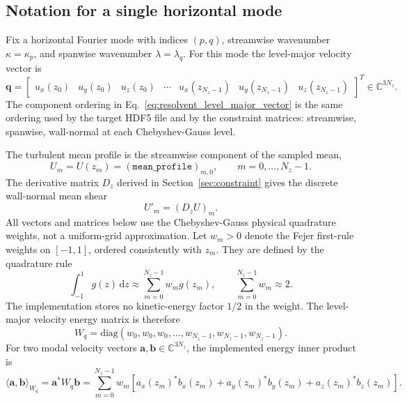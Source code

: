 \documentclass[11pt]{article}
\newcommand{\dd}{\mathrm{d}}
\newcommand{\bfa}{\bm{a}}
\newcommand{\bfb}{\bm{b}}
\newcommand{\bfq}{\bm{q}}
\newcommand{\Dz}{D_z}
\begin{document}
\subsection{Notation for a single horizontal mode}

Fix a horizontal Fourier mode with indices \((p,q)\), streamwise wavenumber
\(\kappa=\kappa_p\), and spanwise wavenumber \(\lambda=\lambda_q\). For this
mode the level-major velocity vector is
\begin{equation}
  \bfq
  =
  \begin{bmatrix}
    u_x(z_0) & u_y(z_0) & u_z(z_0) &
    \cdots &
    u_x(z_{N_z-1}) & u_y(z_{N_z-1}) & u_z(z_{N_z-1})
  \end{bmatrix}^{T}
  \in\mathbb{C}^{3N_z}.
  \label{eq:resolvent_level_major_vector}
\end{equation}
The component ordering in Eq.~\eqref{eq:resolvent_level_major_vector} is the
same ordering used by the target HDF5 file and by the constraint matrices:
streamwise, spanwise, wall-normal at each Chebyshev-Gauss level.

The turbulent mean profile is the streamwise component of the sampled mean,
\begin{equation}
  U_m = U(z_m) =
  \left(\texttt{mean\_profile}\right)_{m,0},
  \qquad m=0,\ldots,N_z-1.
  \label{eq:resolvent_mean_definition}
\end{equation}
The derivative matrix \(\Dz\) derived in Section~\ref{sec:constraint} gives
the discrete wall-normal mean shear
\begin{equation}
  U'_m = \left(\Dz U\right)_m.
  \label{eq:resolvent_mean_shear}
\end{equation}
All vectors and matrices below use the Chebyshev-Gauss physical quadrature
weights, not a uniform-grid approximation. Let \(w_m>0\) denote the Fejer
first-rule weights on \([-1,1]\), ordered consistently with \(z_m\). They are
defined by the quadrature rule
\begin{equation}
  \int_{-1}^{1} g(z)\,\dd z
  \approx
  \sum_{m=0}^{N_z-1} w_m g(z_m),
  \qquad
  \sum_{m=0}^{N_z-1} w_m \approx 2.
  \label{eq:resolvent_quadrature_rule}
\end{equation}
The implementation stores no kinetic-energy factor \(1/2\) in the weight. The
level-major velocity energy matrix is therefore
\begin{equation}
  W_q =
  \mathrm{diag}
  \left(
    w_0,w_0,w_0,\ldots,w_{N_z-1},w_{N_z-1},w_{N_z-1}
  \right).
  \label{eq:resolvent_wq_definition}
\end{equation}
For two modal velocity vectors \(\bfa,\bfb\in\mathbb{C}^{3N_z}\), the
implemented energy inner product is
\begin{equation}
  \langle \bfa,\bfb\rangle_{W_q}
  =
  \bfa^* W_q \bfb
  =
  \sum_{m=0}^{N_z-1} w_m
  \left[
    a_x(z_m)^* b_x(z_m)
    +a_y(z_m)^* b_y(z_m)
    +a_z(z_m)^* b_z(z_m)
  \right].
  \label{eq:resolvent_energy_inner_product}
\end{equation}
\end{document}
